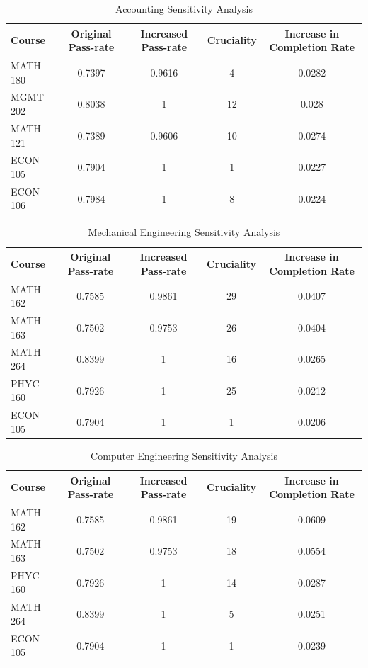 \documentclass[botnum, fleqn]{unmeethesis}
\begin{document}
      \newpage
      \begin{table}[!h]
      \tiny
      \begin{tabular}{l*{4}{c}}
      Course & Original Pass-rate & Increased Pass-rate & Cruciality & Increase in Completion Rate \\
      \hline
      MATH 180 & 0.7397 & 0.9616 & 4 & 0.0282 \\
      MGMT 202 & 0.8038 & 1 & 12 & 0.028 \\
      MATH 121 & 0.7389 & 0.9606 & 10 & 0.0274 \\
      ECON 105 & 0.7904 & 1 & 1 & 0.0227 \\
      ECON 106 & 0.7984 & 1 & 8 & 0.0224 \\
      \end{tabular}
      \caption{Accounting Sensitivity Analysis} 
      \label{tab:accounting_sensitivity}
      \end{table}

      \begin{table}[!h]
      \tiny
      \begin{tabular}{l*{4}{c}}
      Course & Original Pass-rate & Increased Pass-rate & Cruciality & Increase in Completion Rate \\
      \hline
      MATH 162 & 0.7585 & 0.9861 & 29 & 0.0407 \\
      MATH 163 & 0.7502 & 0.9753 & 26 & 0.0404 \\
      MATH 264 & 0.8399 & 1 & 16 & 0.0265 \\
      PHYC 160 & 0.7926 & 1 & 25 & 0.0212 \\
      ECON 105 & 0.7904 & 1 & 1 & 0.0206 \\
      \end{tabular}
      \caption{Mechanical Engineering Sensitivity Analysis}
      \label{tab:me_sensitivity}
      \end{table}

      \begin{table}[!h]
      \tiny
      \begin{tabular}{l*{4}{c}}
      Course & Original Pass-rate & Increased Pass-rate & Cruciality & Increase in Completion Rate \\
      \hline
      MATH 162 & 0.7585 & 0.9861 & 19 & 0.0609 \\
      MATH 163 & 0.7502 & 0.9753 & 18 & 0.0554 \\
      PHYC 160 & 0.7926 & 1 & 14 & 0.0287 \\
      MATH 264 & 0.8399 & 1 & 5 & 0.0251 \\
      ECON 105 & 0.7904 & 1 & 1 & 0.0239 \\
      \end{tabular}
      \caption{Computer Engineering Sensitivity Analysis}
      \label{tab:cpe_sensitivity}
      \end{table}
\end{document}
